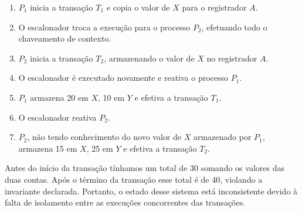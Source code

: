\documentclass[11pt,twoside,a4paper]{book}
\begin{document}



\begin{enumerate}
	\item $P_1$ inicia a transação $T_1$ e copia o valor de $X$ para o registrador $A$.
	\item O escalonador troca a execução para o processo $P_2$, efetuando todo o chaveamento de contexto.
	\item $P_2$ inicia a transação $T_2$, armazenando o valor de $X$ no registrador $A$.
	\item O escalonador é executado novamente e reativa o processo $P_1$.
	\item $P_1$ armazena 20 em $X$, 10 em $Y$ e efetiva a transação $T_1$.
	\item O escalonador reativa $P_2$.
	\item $P_2$, não tendo conhecimento do novo valor de $X$ armazenado por $P_1$, armazena 15 em $X$, 25 em $Y$ e  efetiva a transação $T_2$.
\end{enumerate}

Antes do início da transação tínhamos um total de 30 somando os valores das duas contas. Após o término da transação esse total é de 40, violando a invariante declarada. Portanto, o estado desse sistema está inconsistente devido à falta de isolamento entre as execuções concorrentes das transações.
\end{document}
